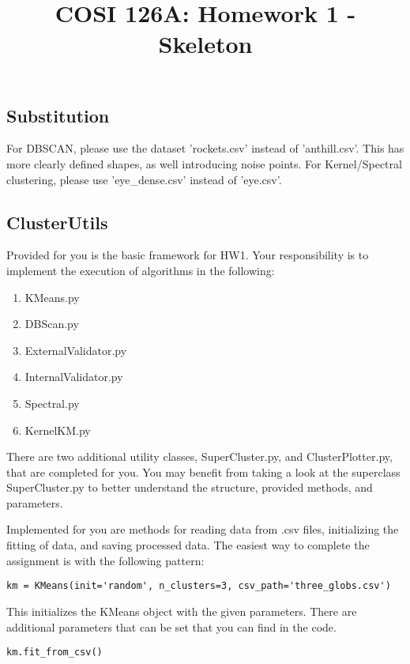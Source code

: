 \documentclass[12pt]{article}
\title{COSI 126A: Homework 1 - Skeleton}
\date{}
\begin{document}
\maketitle

\vspace{0.5in}


\subsection*{Substitution}
For DBSCAN, please use the dataset 'rockets.csv' instead of 'anthill.csv'. This has more clearly defined shapes, as well introducing noise points. For Kernel/Spectral clustering, please use 'eye\_dense.csv' instead of 'eye.csv'.

\subsection*{ClusterUtils}

Provided for you is the basic framework for HW1. Your responsibility is to implement the execution of algorithms in the following:
\begin{enumerate}
	\item KMeans.py
	\item DBScan.py
	\item ExternalValidator.py
	\item InternalValidator.py
	\item Spectral.py
	\item KernelKM.py
\end{enumerate}

There are two additional utility classes, SuperCluster.py, and ClusterPlotter.py, that are completed for you. You may benefit from taking a look at the superclass SuperCluster.py to better understand the structure, provided methods, and parameters. 

Implemented for you are methods for reading data from .csv files, initializing the fitting of data, and saving processed data. The easiest way to complete the assignment is with the following pattern:

\begin{lstlisting}
km = KMeans(init='random', n_clusters=3, csv_path='three_globs.csv')
\end{lstlisting}

This initializes the KMeans object with the given parameters. There are additional parameters that can be set that you can find in the code.

\begin{lstlisting}
km.fit_from_csv()
\end{lstlisting}
\end{document}
